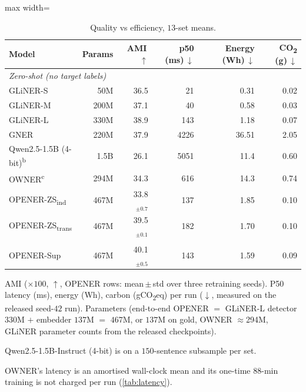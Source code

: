 \documentclass[pdflatex,sn-basic,Numbered]{sn-jnl}
\newcommand{\zstr}{OPENER-ZS\textsubscript{trans}}
\newcommand{\zsind}{OPENER-ZS\textsubscript{ind}}
\begin{document}
\begin{table}[!tp]
\centering
\caption{Quality vs efficiency, $13$-set means.}
\label{tab:efficiency}
\small
\begin{adjustbox}{max width=\textwidth}
\begin{threeparttable}
\begin{tabular}{lrrrrr}
\toprule
Model & Params & AMI\,$\uparrow$ & p50 (ms)\,$\downarrow$ & Energy (Wh)\,$\downarrow$ & CO\textsubscript{2} (g)\,$\downarrow$ \\
\midrule
\multicolumn{6}{l}{\emph{Zero-shot (no target labels)}} \\
GLiNER-S  & 50M  & 36.5 & 21 & 0.31 & 0.02 \\
GLiNER-M  & 200M & 37.1 & 40 & 0.58 & 0.03 \\
GLiNER-L  & 330M & 38.9 & 143 & 1.18 & 0.07 \\
GNER      & 220M & 37.9 & 4226 & 36.51 & 2.05 \\
Qwen2.5-1.5B (4-bit)\textsuperscript{b} & 1.5B & 26.1 & 5051 & 11.4 & 0.60 \\
OWNER\textsuperscript{c} & 294M & 34.3 & 616 & 14.3 & 0.74 \\
\zsind & 467M & 33.8$_{\pm0.7}$ & 137 & 1.85 & 0.10 \\
\rowcolor{hlyellow} \zstr & 467M & 39.5$_{\pm0.1}$ & 182 & 1.70 & 0.10 \\
\addlinespace
\multicolumn{6}{l}{\emph{Supervised (target labels)}} \\
\rowcolor{hlred} OPENER-Sup & 467M & 40.1$_{\pm0.5}$ & 143 & 1.59 & 0.09 \\
\bottomrule
\end{tabular}
\begin{tablenotes}[flushleft]
\footnotesize
\item AMI ($\times 100$, $\uparrow$, OPENER rows: mean\,$\pm$\,std over three retraining seeds). P50 latency (ms), energy (Wh), carbon (gCO\textsubscript{2}eq) per run ($\downarrow$, measured on the released seed-$42$ run). Parameters (end-to-end OPENER $=$ GLiNER-L detector $330$M $+$ embedder $137$M $=$ $467$M, or $137$M on gold, OWNER $\approx$294M, GLiNER parameter counts from the released checkpoints).
\item[b] Qwen2.5-1.5B-Instruct (4-bit) is on a $150$-sentence subsample per set.
\item[c] OWNER's latency is an amortised wall-clock mean and its one-time $88$-min training is not charged per run (\autoref{tab:latency}).
\end{tablenotes}
\end{threeparttable}
\end{adjustbox}
\end{table}
\end{document}

